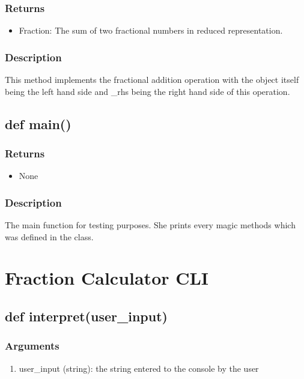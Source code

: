 \documentclass[refman]{scrartcl}
\begin{document}
\subsubsection*{Returns}
\begin{itemize}
	\item Fraction: The sum of two fractional numbers in reduced representation.
\end{itemize}

\subsubsection*{Description}
This method implements the fractional addition operation
with the object itself being the left hand side
and \_rhs being the right hand side of this operation.

\subsection{def main()}

\subsubsection*{Returns}

\begin{itemize}
	\item None
\end{itemize}

\subsubsection*{Description}

The main function for testing purposes. She prints every magic methods which was defined in the class.

\section{Fraction Calculator CLI}

\subsection{def interpret(user\_input)}

\subsubsection*{Arguments}

\begin{enumerate}
	\item user\_input (string): the string entered to the console by the user
\end{enumerate}
\end{document}
